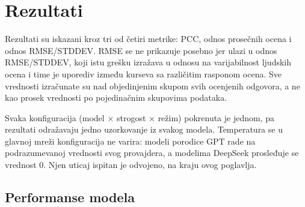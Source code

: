 \chapter{Rezultati}
\label{sec:rezultati}

Rezultati su iskazani kroz tri od četiri metrike: PCC, odnos prosečnih ocena i odnos RMSE/STDDEV.
RMSE se ne prikazuje posebno jer ulazi u odnos RMSE/STDDEV,
koji istu grešku izražava u odnosu na varijabilnost ljudskih ocena i time je uporediv između kurseva sa različitim rasponom ocena.
Sve vrednosti izračunate su nad objedinjenim skupom svih ocenjenih odgovora,
a ne kao prosek vrednosti po pojedinačnim skupovima podataka.

Svaka konfiguracija (model $\times$ strogost $\times$ režim) pokrenuta je jednom,
pa rezultati odražavaju jedno uzorkovanje iz svakog modela.
Temperatura se u glavnoj mreži konfiguracija ne varira:
modeli porodice GPT rade na podrazumevanoj vrednosti svog provajdera,
a modelima DeepSeek prosleđuje se vrednost $0$.
Njen uticaj ispitan je odvojeno, na kraju ovog poglavlja.

\section{Performanse modela}
\label{sec:performanse}

\begin{table}[ht]
\centering
\caption{Metrike performansi za PRA režim kroz modele i konfiguracije strogosti.
Najbolji rezultati za svaku metriku i konfiguraciju strogosti označeni su podebljano.
Za odnos prosečnih ocena najboljom se smatra vrednost najbliža 1{,}0.}
\label{tab:pra_results}
\end{table}

